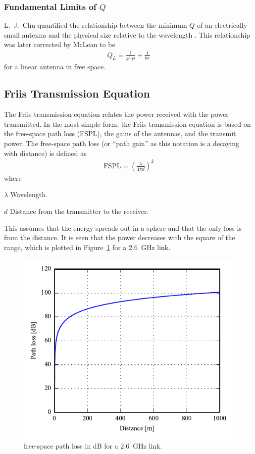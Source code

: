 \subsubsection{Fundamental Limits of $Q$}
\label{sec:fun_lim}
L.\ J.\ Chu quantified the relationship between the minimum $Q$ of an electrically small antenna and the physical size relative to the wavelength \cite{chu1948}. This relationship was later corrected by McLean \cite{mclean1996} to be
\begin{align} %
  Q_L = \frac{1}{k^3a^3}+ \frac{1}{ka}
\end{align}
for a linear antenna in free space.

\subsection{Friis Transmission Equation}
The Friis transmission equation relates the power received with the power transmitted. In the most simple form, the Friis transmission equation is based on the free-space path loss (FSPL), the gains of the antennas, and the transmit power. The free-space path loss (or ``path gain'' as this notation is a decaying with distance) is defined as \cite{balanis2012antenna}
\begin{align} %
  \label{eq:fspl}
  \text{FSPL} = \left( \frac{\lambda}{4 \pi d} \right)^2 
\end{align}
where
\begin{where}
\item[$\lambda$] Wavelength.
\item[$d$] Distance from the transmitter to the receiver.
\end{where}
This assumes that the energy spreads out in a sphere and that the only loss is from the distance. It is seen that the power decreases with the square of the range, which is plotted in Figure~\ref{fig:fspl-plot} for a \SI{2.6}{GHz} link.

\begin{figure}[htbp]
  \centering
  \includegraphics{img/analysis/distancePathloss}
  \caption{free-space path loss in dB for a \SI{2.6}{GHz} link.}
  \label{fig:fspl-plot}
\end{figure}

